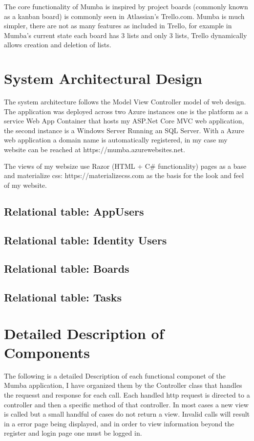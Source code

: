 \documentclass[letterpaper]{article}
\begin{document}
The core functionality of Mumba is inspired by project boards (commonly known as  a kanban board) is commonly seen in Atlassian's Trello.com. Mumba is much simpler, there are not as many features as included in Trello, for example in Mumba's current state each board has 3 lists and only 3 lists, Trello dynamically allows creation and deletion of lists.

\section{System Architectural Design}

The system architecture follows the Model View Controller model of web design. The application was deployed across two Azure instances one is the platform as a service Web App Container that hosts my ASP.Net Core MVC web application, the second instance is a Windows Server Running an SQL Server. With a Azure web application a domain name is automatically registered, in my case my website can be reached at https://mumba.azurewebsites.net.

The views of my websize use Razor (HTML + C\# functionality) pages as a base and materialize css: https://materializecss.com as the basis for the look and feel of my website.

\subsection{Relational table: AppUsers}

\subsection{Relational table: Identity Users}

\subsection{Relational table: Boards}

\subsection{Relational table: Tasks}

\section{Detailed Description of Components}

The following is a detailed Description of each functional componet of the Mumba application, I have organized them by the Controller class that handles the requesst and response for each call. Each handled http request is directed to a controller and then a specific method of that controller. In most cases a new view is called but a small handful of cases do not return a view.
Invalid calls will result in a error page being displayed, and in order to view information beyond the register and login page one must be logged in.
\end{document}
